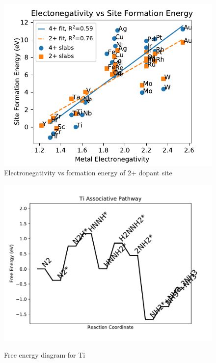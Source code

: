 \documentclass[journal=jacsat,manuscript=article]{achemso}
\begin{document}
\begin{figure}
\centering
\includegraphics[width=0.8\linewidth]{Images/electronegativity_vs_formation.pdf}
\caption{Electronegativity vs formation energy of 2+ dopant site}
\label{fig:electronegativity}
\end{figure}

\twocolumn
\newpage
\begin{figure}
\includegraphics[width=1\linewidth]{data/plots/Ti_associative.pdf}
\label{fig:Ti_associative}
\caption{Free energy diagram for Ti}
\end{figure}
\end{document}

